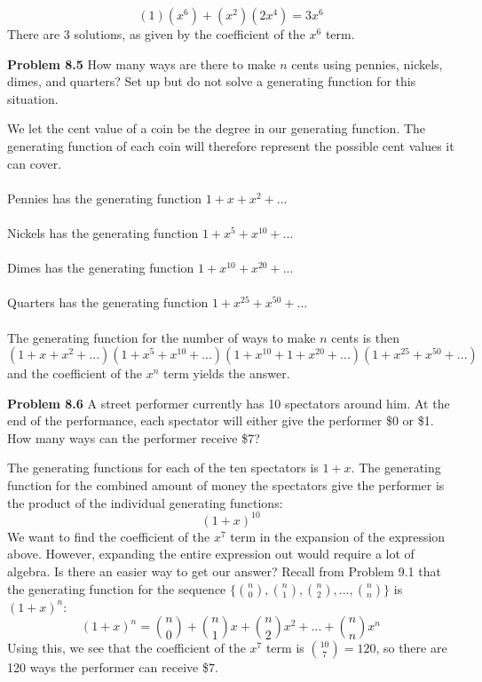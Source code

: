 \documentclass[11pt]{scrartcl}
\begin{document}
$$(1)(x^6)+(x^2)(2x^4)=3x^6$$
There are 3 solutions, as given by the coefficient of the $x^6$ term. 
\begin{tcolorbox}
\textbf{Problem 8.5} How many ways are there to make $n$ cents using pennies, nickels, dimes, and quarters? Set up but do not solve a generating function for this situation. 
\end{tcolorbox}
\noindent 
We let the cent value of a coin be the degree in our generating function. The generating function of each coin will therefore represent the possible cent values it can cover.\\\
\\
\noindent 
Pennies has the generating function $1+x+x^2+...$\\
\\
\noindent 
Nickels has the generating function $1+x^5+x^{10}+...$\\
\\
\noindent 
Dimes has the generating function $1+x^{10}+x^{20}+...$\\
\\
\noindent 
Quarters has the generating function $1+x^{25}+x^{50}+...$\\
\\
\noindent 
The generating function for the number of ways to make $n$ cents is then 
$$(1+x+x^2+...)(1+x^5+x^{10}+...)(1+x^{10}+1+x^{20}+...)(1+x^{25}+x^{50}+...)$$
and the coefficient of the $x^n$ term yields the answer.
\begin{tcolorbox}
\textbf{Problem 8.6} A street performer currently has 10 spectators around him. At the end of the performance, each spectator will either give the performer \$0 or \$1. How many ways can the performer receive \$7?
\end{tcolorbox}
\noindent 
The generating functions for each of the ten spectators is $1+x$. The generating function for the combined amount of money the spectators give the performer is the product of the individual generating functions: 
$$(1+x)^{10}$$
We want to find the coefficient of the $x^7$ term in the expansion of the expression above. However, expanding the entire expression out would require a lot of algebra. Is there an easier way to get our answer? Recall from Problem 9.1 that the generating function for the sequence $\{{n \choose 0}, {n \choose 1}, {n \choose 2},...,{n \choose n}\}$ is $(1+x)^n$:
$$(1+x)^n={n \choose 0}+{n \choose 1}x+{n \choose 2}x^2+...+{n \choose n}x^n$$
Using this, we see that the coefficient of the $x^7$ term is ${10 \choose 7}=120$, so there are 120 ways the performer can receive \$7.
\end{document}
